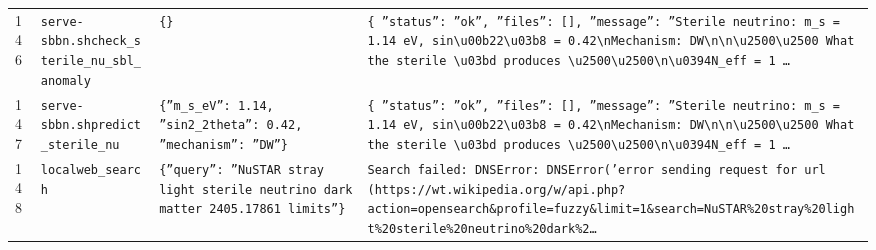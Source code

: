 \documentclass[11pt,a4paper]{article}
\begin{document}
\begin{longtable}{@{}p{}p{}p{}p{}@{}}
146 & \texttt{serve-sbbn.sh}\newline\texttt{check\_\allowbreak{}sterile\_\allowbreak{}nu\_\allowbreak{}sbl\_\allowbreak{}anomaly} & \texttt{\{\}\allowbreak{}} & \texttt{\{   ''status'':\allowbreak{} ''ok'',\allowbreak{}   ''files'':\allowbreak{} []\allowbreak{},\allowbreak{}   ''message'':\allowbreak{} ''Sterile neutrino:\allowbreak{} m\_\allowbreak{}s =\allowbreak{} 1.14 eV,\allowbreak{} sin\textbackslash{}\allowbreak{}u00b22\textbackslash{}\allowbreak{}u03b8 =\allowbreak{} 0.42\textbackslash{}\allowbreak{}nMechanism:\allowbreak{} DW\textbackslash{}\allowbreak{}n\textbackslash{}\allowbreak{}n\textbackslash{}\allowbreak{}u2500\textbackslash{}\allowbreak{}u2500 What the sterile \textbackslash{}\allowbreak{}u03bd produces \textbackslash{}\allowbreak{}u2500\textbackslash{}\allowbreak{}u2500\textbackslash{}\allowbreak{}n\textbackslash{}\allowbreak{}u0394N\_\allowbreak{}eff =\allowbreak{} 1 \ldots{}\allowbreak{}} \\
147 & \texttt{serve-sbbn.sh}\newline\texttt{predict\_\allowbreak{}sterile\_\allowbreak{}nu} & \texttt{\{''m\_\allowbreak{}s\_\allowbreak{}eV'':\allowbreak{} 1.14,\allowbreak{} ''sin2\_\allowbreak{}2theta'':\allowbreak{} 0.42,\allowbreak{} ''mechanism'':\allowbreak{} ''DW''\}\allowbreak{}} & \texttt{\{   ''status'':\allowbreak{} ''ok'',\allowbreak{}   ''files'':\allowbreak{} []\allowbreak{},\allowbreak{}   ''message'':\allowbreak{} ''Sterile neutrino:\allowbreak{} m\_\allowbreak{}s =\allowbreak{} 1.14 eV,\allowbreak{} sin\textbackslash{}\allowbreak{}u00b22\textbackslash{}\allowbreak{}u03b8 =\allowbreak{} 0.42\textbackslash{}\allowbreak{}nMechanism:\allowbreak{} DW\textbackslash{}\allowbreak{}n\textbackslash{}\allowbreak{}n\textbackslash{}\allowbreak{}u2500\textbackslash{}\allowbreak{}u2500 What the sterile \textbackslash{}\allowbreak{}u03bd produces \textbackslash{}\allowbreak{}u2500\textbackslash{}\allowbreak{}u2500\textbackslash{}\allowbreak{}n\textbackslash{}\allowbreak{}u0394N\_\allowbreak{}eff =\allowbreak{} 1 \ldots{}\allowbreak{}} \\
148 & \texttt{local}\newline\texttt{web\_\allowbreak{}search} & \texttt{\{''query'':\allowbreak{} ''NuSTAR stray light sterile neutrino dark matter 2405.17861 limits''\}\allowbreak{}} & \texttt{Search failed:\allowbreak{} DNSError:\allowbreak{} DNSError('error sending request for url (https:\allowbreak{}/\allowbreak{}/\allowbreak{}wt.wikipedia.org/\allowbreak{}w/\allowbreak{}api.php?action=\allowbreak{}opensearch\&profile=\allowbreak{}fuzzy\&limit=\allowbreak{}1\&search=\allowbreak{}NuSTAR\%20stray\%20light\%20sterile\%20neutrino\%20dark\%2\ldots{}\allowbreak{}} \\

\end{longtable}
\end{document}
